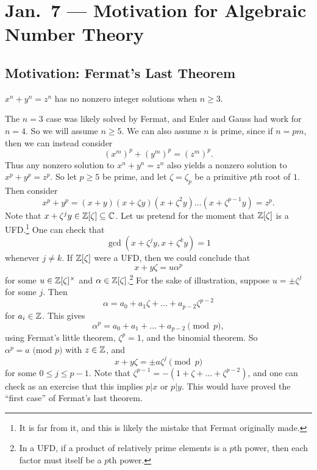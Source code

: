 \chapter{Jan.~7 --- Motivation for Algebraic Number Theory}

\section{Motivation: Fermat's Last Theorem}

\begin{theorem}
  $x^n + y^n = z^n$
  has no nonzero integer solutions when $n \ge 3$.
\end{theorem}

\begin{remark}
  The $n = 3$ case was likely solved by Fermat, and
  Euler and Gauss had work for $n = 4$. So we will
  assume
  $n \ge 5$. We can also assume $n$ is prime, since
  if $n = pm$, then we can instead consider
  \[
    (x^m)^p + (y^m)^p = (z^m)^p.
  \]
  Thus any nonzero solution to $x^n + y^n = z^n$
  also yields a nonzero solution to $x^p + y^p = z^p$.
  So let $p \ge 5$ be prime, and let
  $\zeta = \zeta_p$ be a primitive $p$th root of $1$.
  Then consider
  \[
    x^p + y^p = (x + y) (x + \zeta y) (x + \zeta^2 y) \dots (x + \zeta^{p-1} y) = z^p.
  \]
  Note that $x + \zeta^j y \in \mathbb{Z}[\zeta] \subseteq \mathbb{C}$.
  Let us pretend for the moment that $\mathbb{Z}[\zeta]$ is
  a UFD.\footnote{It is far from it, and this is likely the mistake that Fermat originally made.}
  One can check that
  \[
    \gcd(x + \zeta^j y, x + \zeta^k y) = 1
  \]
  whenever $j \ne k$. If $\mathbb{Z}[\zeta]$ were a UFD, then
  we could conclude that
  \[
    x + y \zeta = u \alpha^p
  \]
  for some $u \in \mathbb{Z}[\zeta]^\times$ and
  $\alpha \in \mathbb{Z}[\zeta]$.\footnote{In a UFD, if a product of relatively prime elements is a $p$th power, then each factor must itself be a $p$th power.}
  For the sake of illustration, suppose $u = \pm \zeta^j$
  for some $j$.
  Then
  \[
    \alpha = a_0 + a_1 \zeta + \dots + a_{p - 2} \zeta^{p - 2}
  \]
  for $a_i \in \mathbb{Z}$. This gives
  \[
    \alpha^p = a_0 + a_1 + \dots + a_{p - 2} \pmod{p},
  \]
  using Fermat's little theorem, $\zeta^p = 1$,
  and the binomial theorem. So
  $\alpha^p = a \text{ (mod $p$)}$ with $z \in \mathbb{Z}$,
  and
  \[
    x + y \zeta = \pm a \zeta^j \pmod{p}
  \]
  for some $0 \le j \le p - 1$. Note that
  $\zeta^{p - 1} = -(1 + \zeta + \dots + \zeta^{p - 2})$,
  and one can check as an exercise that this implies
  $p | x$ or $p | y$. This would have proved the
  ``first case'' of Fermat's last theorem.
\end{remark}

